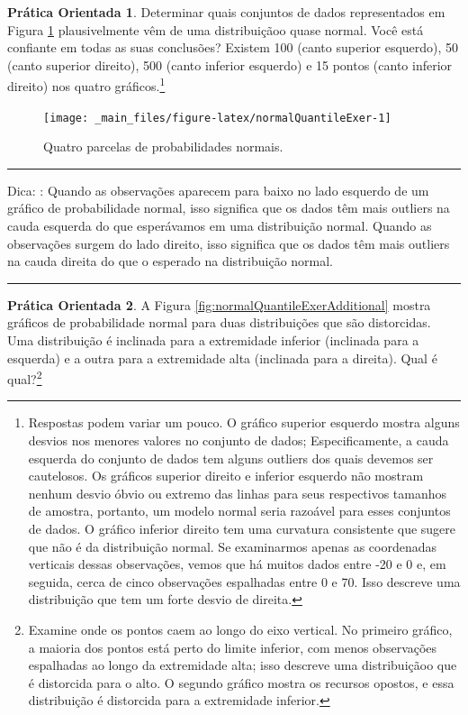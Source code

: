 \documentclass[
]{book}
\theoremstyle{definition}
\theoremstyle{definition}
\theoremstyle{definition}
\newtheorem{exercise}{Prática Orientada}[chapter]
\theoremstyle{definition}
\theoremstyle{remark}
\begin{document}
\begin{exercise}
\protect\hypertarget{exr:unnamed-chunk-120}{}{\label{exr:unnamed-chunk-120} }Determinar quais conjuntos de dados representados em Figura \ref{fig:normalQuantileExer} plausivelmente vêm de uma distribuiçãoo quase normal. Você está confiante em todas as suas conclusões? Existem 100 (canto superior esquerdo), 50 (canto superior direito), 500 (canto inferior esquerdo) e 15 pontos (canto inferior direito) nos quatro gráficos.\footnote{Respostas podem variar um pouco. O gráfico superior esquerdo mostra alguns desvios nos menores valores no conjunto de dados; Especificamente, a cauda esquerda do conjunto de dados tem alguns outliers dos quais devemos ser cautelosos. Os gráficos superior direito e inferior esquerdo não mostram nenhum desvio óbvio ou extremo das linhas para seus respectivos tamanhos de amostra, portanto, um modelo normal seria razoável para esses conjuntos de dados. O gráfico inferior direito tem uma curvatura consistente que sugere que não é da distribuição normal. Se examinarmos apenas as coordenadas verticais dessas observações, vemos que há muitos dados entre -20 e 0 e, em seguida, cerca de cinco observações espalhadas entre 0 e 70. Isso descreve uma distribuição que tem um forte desvio de direita.}
\end{exercise}

\begin{figure}
\texttt{[image: \_main\_files/figure-latex/normalQuantileExer-1]} \caption{ Quatro parcelas de probabilidades normais.}\label{fig:normalQuantileExer}
\end{figure}

\begin{center}\rule{0.5\linewidth}{0.5pt}\end{center}

Dica: : Quando as observações aparecem para baixo no lado esquerdo de um gráfico de probabilidade normal, isso significa que os dados têm mais outliers na cauda esquerda do que esperávamos em uma distribuição normal. Quando as observações surgem do lado direito, isso significa que os dados têm mais outliers na cauda direita do que o esperado na distribuição normal.

\begin{center}\rule{0.5\linewidth}{0.5pt}\end{center}

\begin{exercise}
\protect\hypertarget{exr:unnamed-chunk-121}{}{\label{exr:unnamed-chunk-121} }
A Figura \ref{fig:normalQuantileExerAdditional} mostra gráficos de probabilidade normal para duas distribuições que são distorcidas. Uma distribuição é inclinada para a extremidade inferior (inclinada para a esquerda) e a outra para a extremidade alta (inclinada para a direita). Qual é qual?\footnote{Examine onde os pontos caem ao longo do eixo vertical. No primeiro gráfico, a maioria dos pontos está perto do limite inferior, com menos observações espalhadas ao longo da extremidade alta; isso descreve uma distribuiçãoo que é distorcida para o alto. O segundo gráfico mostra os recursos opostos, e essa distribuição é distorcida para a extremidade inferior.}
\end{exercise}
\end{document}
